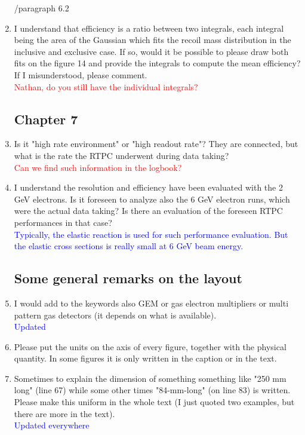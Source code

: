 \documentclass[a4paper,11pt,twoside]{article}
\begin{document}
\begin{enumerate}
        /paragraph 6.2
\item I understand that efficiency is a ratio between two integrals, each 
   integral being the area of the Gaussian which fits the recoil mass 
   distribution in the inclusive and exclusive case. If so, would it be 
   possible to please draw both fits on the figure 14 and provide the integrals 
   to compute the mean efficiency? If I misunderstood, please comment.\\
\textcolor{red}{Nathan, do you still have the individual integrals? } 

\subsection*{ Chapter 7} 

\item Is it "high rate environment" or "high readout rate"? They are connected, 
   but what is the rate the RTPC underwent during data taking?\\
\textcolor{red}{Can we find such information in the logbook?} 

\item I understand the resolution and efficiency have been evaluated with the 2 
   GeV electrons. Is it foreseen to analyze also the 6 GeV electron runs, which 
   were the actual data taking? Is there an evaluation of the foreseen RTPC 
   performances in that case?\\
\textcolor{blue}{Typically, the elastic reaction is used for such performance 
evaluation. But the elastic cross sections is really small at 6 GeV beam 
energy.} 

\subsection*{ Some general remarks on the layout}

\item I would add to the keywords also GEM or gas electron multipliers or multi 
   pattern gas detectors (it depends on what is available).\\
\textcolor{blue}{Updated} 

\item Please put the units on the axis of every figure, together with the 
   physical quantity. In some figures it is only written in the caption or in 
   the text.\\
\textcolor{blue}{ } 

\item Sometimes to explain the dimension of something something like "250 mm 
   long" (line 67) while some other times "84-mm-long" (on line 83) is written. 
   Please make this uniform in the whole text (I just quoted two examples, but 
   there are more in the text).\\
\textcolor{blue}{Updated everywhere} 


\end{enumerate}
\end{document}
